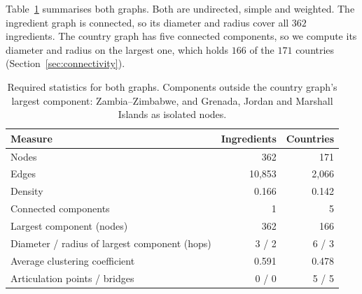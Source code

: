 Table~\ref{tab:stats} summarises both graphs. Both are undirected, simple and
weighted. The ingredient graph is connected, so its diameter and radius cover
all $362$ ingredients. The country graph has five connected components, so we
compute its diameter and radius on the largest one, which holds $166$ of the
$171$ countries (Section~\ref{sec:connectivity}).

\begin{table}[h]
\centering
\begin{tabular}{lrr}
\toprule
Measure & Ingredients & Countries \\
\midrule
Nodes & 362 & 171 \\
Edges & 10{,}853 & 2{,}066 \\
Density & 0.166 & 0.142 \\
Connected components & 1 & 5 \\
Largest component (nodes) & 362 & 166 \\
Diameter / radius of largest component (hops) & 3 / 2 & 6 / 3 \\
Average clustering coefficient & 0.591 & 0.478 \\
Articulation points / bridges & 0 / 0 & 5 / 5 \\
\bottomrule
\end{tabular}
\caption{Required statistics for both graphs. Components outside the country
graph's largest component: Zambia--Zimbabwe, and Grenada, Jordan and Marshall
Islands as isolated nodes.}
\label{tab:stats}
\end{table}

